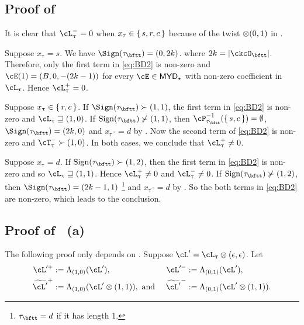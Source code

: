 \documentclass[12pt,a4paper]{amsart}
\def\MYD{{\mathsf{MYD}}}
\def\abs#1{\left|{#1}\right|}
\numberwithin{equation}{section}
\theoremstyle{remark}
\def\ssign{\mathrm{Sign}}
\def\uptaupp{\uptau^{\prime\prime}}
\begin{document}
\subsection*{\bf Proof of  }


It is clear that $\nac{\uptau}=0$ when $x_{\tau}\in \set{s,r,c}$ because of
the twist $\otimes(0, 1)$ in .

  \begin{enumPF}
    \item  Suppose $x_{\uptau}=s$. We have $\Sign(\tau_{\bftt})=(0,2k)$.
    where $2k= \abs{\ckcO_{\bftt}}$.
    Therefore, only the first term in  \eqref{eq:BD2} is non-zero and
    $\cE(1) = (B,0,-(2k-1))$ for every $\cE\in \MYD_{\star}$ with non-zero
    coefficient in
    $\ac_{\uptau}$.
    Hence $\pac{\uptau}=0$.
    \item Suppose $x_{\uptau} \in \set{r,c}$. If
    $\Sign(\tau_{\bftt})\succ(1,1)$, the first term in \eqref{eq:BD2} is
    non-zero and $\ac_{\uptau} \sqsupseteq (1,0)$. If
    $\ssign(\tau_{\bftt})\nsucc (1,1)$, then
    $\cP_{\tau_{\bftt}}^{-1}(\set{s,c})=\emptyset$, $\Sign(\tau_{\bftt})=(2k,0)$
    and $x_{\uptaupp}=d$ by . Now the second term of
    \eqref{eq:BD2} is non-zero and $\ncT_{\uptau}\succ (1,0)$.
    In both cases, we conclude that $\pac{\uptau}\neq 0$.
    \item Suppose $x_{\uptau}=d$. If $\ssign(\tau_{\bftt})\succ (1,2)$,
    then the first term in \eqref{eq:BD2} is non-zero and so
    $\ac_{\uptau}\sqsupseteq (1,1)$. Hence $\pac{\uptau}\neq 0$ and
    $\nac{\uptau}\neq 0$.
    If  $\ssign(\tau_{\bftt})\nsucc(1,2)$, then $\Sign(\tau_{\bftt}) = (2k-1,1)$
    \footnote{$\tau_{\bftt}=d$ if it has length 1.} and
    $x_{\uptaupp}=d$ by .
    So the both terms in \eqref{eq:BD2} are non-zero, which leads to the conclusion.
  \end{enumPF}

\subsection*{\bf Proof of ~(a) }
\def\opac{\cL'^+}
\def\onac{\cL'^-}
\def\tpac{\widetilde{\cL'}^+}
\def\tnac{\widetilde{\cL'}^-}
The following proof only depends on .
Suppose $\cL' = \ac_{\uptau}\lotimes (\epsilon,\epsilon)$.
Let
  \begin{align*}
    \opac &:= \Lambda_{(1,0)}(\cL'), &
    \onac &:= \Lambda_{(0,1)}(\cL'), \\
    \tpac &:= \Lambda_{(1,0)}(\cL'\lotimes (1,1)),\text{ and } &
    \tnac &:= \Lambda_{(0,1)}(\cL'\lotimes (1,1)).
  \end{align*}
\end{document}
